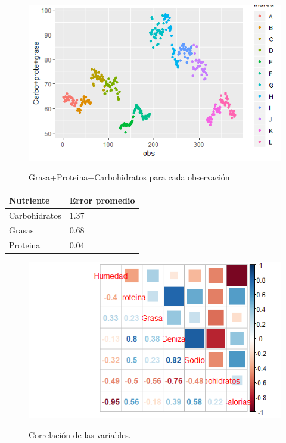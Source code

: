 \documentclass[pdf]{beamer}
\begin{document}
\begin{frame}
\begin{figure}[h]
\centering
\includegraphics[scale=.65]{images/pgc.png} 
\label{i10}
\caption{Grasa+Proteina+Carbohidratos para cada observación}
\end{figure}
\end{frame}


\begin{frame}
\begin{table}[htbp]
\begin{center}
\begin{tabular}{|l|l|}
\hline
Nutriente&Error promedio\\ \hline\hline
Carbohidratos&1.37\\ \hline
Grasas&0.68\\ \hline
Proteina&0.04\\ \hline
\end{tabular}
\end{center}
\end{table}
\end{frame}

\begin{frame}
\begin{figure}[h]
\centering
\includegraphics[scale=.65]{images/corr.png} 
\label{i11}
\caption{Correlación de las variables.}
\end{figure}
\end{frame}
\end{document}
